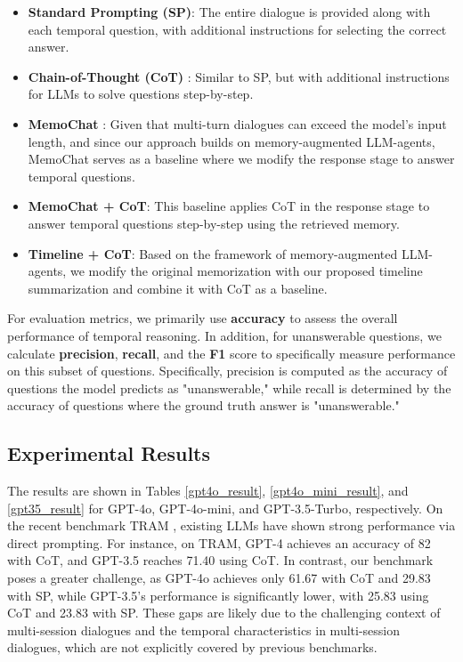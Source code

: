 \begin{itemize} 
    \item \textbf{Standard Prompting (SP)}: The entire dialogue is provided along with each temporal question, with additional instructions for selecting the correct answer.

    \item \textbf{Chain-of-Thought (CoT)} \cite{wei2022chain}: Similar to SP, but with additional instructions for LLMs to solve questions step-by-step.

    \item \textbf{MemoChat} \cite{lu2023memochat}: Given that multi-turn dialogues can exceed the model's input length, and since our approach builds on memory-augmented LLM-agents, MemoChat serves as a baseline where we modify the response stage to answer temporal questions.

    \item \textbf{MemoChat + CoT}: This baseline applies CoT in the response stage to answer temporal questions step-by-step using the retrieved memory.

    \item \textbf{Timeline + CoT}: Based on the framework of memory-augmented LLM-agents, we modify the original memorization with our proposed timeline summarization and combine it with CoT as a baseline.
\end{itemize}

For evaluation metrics, we primarily use \textbf{accuracy} to assess the overall performance of temporal reasoning. In addition, for unanswerable questions, we calculate \textbf{precision}, \textbf{recall}, and the \textbf{F1} score to specifically measure performance on this subset of questions. Specifically, precision is computed as the accuracy of questions the model predicts as "unanswerable," while recall is determined by the accuracy of questions where the ground truth answer is "unanswerable."

\subsection{Experimental Results} 
The results are shown in Tables \ref{gpt4o_result}, \ref{gpt4o_mini_result}, and \ref{gpt35_result} for GPT-4o, GPT-4o-mini, and GPT-3.5-Turbo, respectively. On the recent benchmark TRAM \cite{wang-zhao-2024-tram}, existing LLMs have shown strong performance via direct prompting. For instance, on TRAM, GPT-4 achieves an accuracy of 82 with CoT, and GPT-3.5 reaches 71.40 using CoT. In contrast, our benchmark poses a greater challenge, as GPT-4o achieves only 61.67 with CoT and 29.83 with SP, while GPT-3.5’s performance is significantly lower, with 25.83 using CoT and 23.83 with SP. These gaps are likely due to the challenging context of multi-session dialogues and the temporal characteristics in multi-session dialogues, which are not explicitly covered by previous benchmarks.

